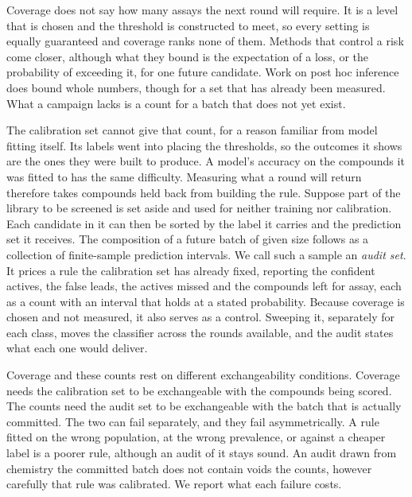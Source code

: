 \documentclass[twocolumn,10pt]{article}
\begin{document}
Coverage does not say how many assays the next round will require. It is a level that is chosen and the threshold is constructed to meet, so every setting is equally guaranteed and coverage
ranks none of them. Methods that control a risk come closer, although what they bound is the
expectation of a loss, or the probability of exceeding it, for one future
candidate.\citep{bates2021distribution,Angelopoulos2024CRC,Angelopoulos2021LTT} Work on post hoc
inference does bound whole numbers, though for a set that has already been measured. What a campaign lacks is a count for a batch that does not yet exist.

The calibration set cannot give that count, for a reason familiar from model fitting itself. Its labels went into placing the thresholds, so the outcomes it shows are the ones they were built to produce. A model's accuracy on the compounds it was fitted to has the same difficulty. Measuring what a round will return therefore takes compounds held back from building the rule. Suppose part of the library to be screened is set aside and used for neither training nor calibration. Each candidate in it can then be sorted by the label it carries and the prediction set it receives. The composition of a future batch of given size follows as a collection of finite-sample prediction intervals. We call such a sample an \emph{audit set}. It prices a rule the calibration set has already fixed, reporting the confident actives, the false leads, the actives missed and the compounds left for assay, each as a count with an interval that holds at a stated probability. Because coverage is chosen and not
measured, it also serves as a control. Sweeping it, separately for each class, moves the classifier across the rounds available, and the audit states what each one would deliver.

Coverage and these counts rest on different exchangeability conditions. Coverage needs the calibration set to be exchangeable with the compounds being scored. The counts need the audit set to be exchangeable with the batch that is
actually committed. The two can fail separately, and they fail asymmetrically. A rule fitted on the wrong population, at the wrong prevalence, or against a cheaper label is a poorer rule, although an audit of it stays sound. An audit drawn from chemistry the committed batch does not contain voids the counts, however carefully that rule was calibrated. We report what each failure costs.
\end{document}
